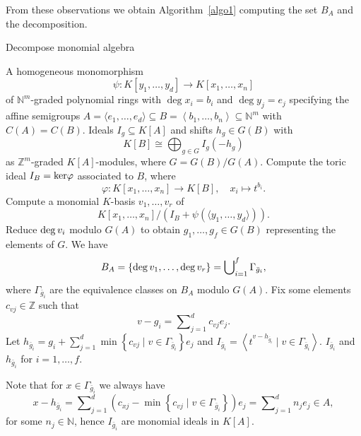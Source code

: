 \documentclass[11pt,a4paper]{amsart}%
\theoremstyle{definition}
\theoremstyle{remark}
\numberwithin{equation}{section}
\theoremstyle{plain}
\newcommand{\de}{{\rm deg}\,}
\newcommand{\maxk}[1]{\left\{#1\right\}}
\begin{document}
From these observations we obtain Algorithm~\ref{algo1} computing the set $B_A$ and the decomposition.



\begin{algorithm}[H]           
\caption{Decompose monomial algebra}  
\begin{algorithmic}[1]\label{algo1}

\REQUIRE  A homogeneous monomorphism
\[
\psi:K[y_{1},\ldots,y_{d}] \rightarrow K[x_{1},\ldots,x_{n}]
\]
of $\mathbb N^m$-graded polynomial rings with $\deg x_{i}=b_{i}$ and $\deg y_{j}=e_{j}$ specifying the affine semigroups $A=\langle e_{1},\ldots,e_{d}\rangle\subseteq B=\left\langle b_{1},\ldots,b_{n}\right\rangle\subseteq \mathbb N^m$ with $C(A)=C(B)$.
\ENSURE Ideals $I_{g}\subseteq K[A]$ and shifts $h_g\in G(B)$ with
\[
K[B] \cong\bigoplus\nolimits_{g\in G} I_{g} (-h_{g})
\]
as $\mathbb Z^m$-graded $K[A]$-modules, where $G=G(B)/G(A)$.
\STATE Compute the toric ideal $I_B={\rm ker}\varphi$ associated to $B$, where
\[
\varphi: K[x_{1},\ldots,x_{n}] \rightarrow K[B], \quad x_i\mapsto t^{b_i}.
\]
\STATE Compute a monomial $K$-basis $v_{1},\ldots,v_{r}$ of
\[
K[x_{1},\ldots,x_{n}]/(I_B+\psi(\langle y_{1},\ldots,y_{d}\rangle)).
\]
\STATE Reduce $\de v_{i}$ modulo $G(A)$ to obtain $g_{1},\ldots,g_{f}\in G(B)$ representing the elements of $G$.
\STATE We have
\[
B_A= \{\de v_{1},\ldots,\de v_{r}\}=\bigcup\nolimits_{i=1}^f\Gamma_{\bar g_i},
\]
where $\Gamma_{\bar g_i}$ are the equivalence classes on $B_A$ modulo $G(A)$.
\STATE Fix some elements $c_{vj}\in\mathbb Z$ such that
\[
v-g_i =\sum\nolimits_{j=1}^d c_{vj}e_j.
\]
\ENDFOR
\STATE Let $h_{\bar g_i}=g_i+\sum\nolimits_{j=1}^d \min\maxk{c_{vj}\mid v\in \Gamma_{\bar g_i}}e_j$ and $I_{\bar g_i}=\left\langle t^{v -h_{\bar g_i}}\mid v\in \Gamma_{\bar g_i}
\right\rangle $.
\ENDFOR
\RETURN $I_{\bar g_i}$ and $h_{\bar g_i}$ for $i=1,\ldots,f$.

\end{algorithmic}
\end{algorithm}

Note that for $x\in\Gamma_{\bar{g}_{i}}$ we always have
\[
x-h_{\bar{g}_{i}}=\sum\nolimits_{j=1}^{d}\left(  c_{xj}-\min\left\{
c_{vj}\mid v\in\Gamma_{\bar{g}_{i}}\right\}  \right)  e_{j}=\sum
\nolimits_{j=1}^{d}n_{j}e_{j}\in A,
\]
for some $n_{j}\in\mathbb{N}$, hence $I_{\bar g_i}$ are monomial ideals in $K[A]$.
\end{document}

